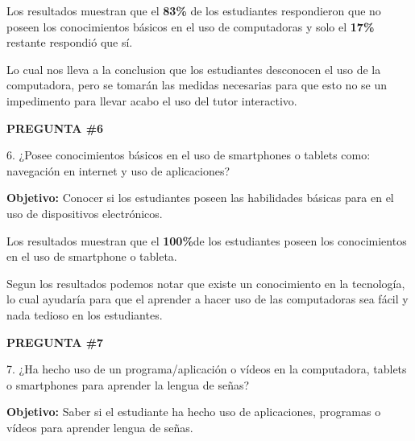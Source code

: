 \documentclass[12pt]{report}%
\begin{document}
\begin{center}
\end{center}


Los resultados muestran que el \textbf{83\%} de los estudiantes respondieron que no poseen los conocimientos básicos en el uso de computadoras y solo el \textbf{17\%} restante respondió que sí.

Lo cual nos lleva  a la conclusion que los estudiantes desconocen el uso de la computadora, pero se tomarán las medidas necesarias para que esto no se un impedimento para llevar acabo el uso del tutor interactivo.

\newpage
\textbf{PREGUNTA \#6}

6. ¿Posee conocimientos básicos en el uso de smartphones o tablets como: navegación en internet y uso de aplicaciones?

\textbf{Objetivo:} Conocer si los estudiantes poseen las habilidades básicas para en el uso de dispositivos electrónicos.

\begin{center}
\end{center}


Los resultados muestran que el \textbf{100\%}de los estudiantes poseen los conocimientos en el uso de smartphone o tableta.

Segun los resultados podemos notar que existe un conocimiento en la tecnología, lo cual ayudaría para que el aprender a hacer uso de las computadoras sea fácil y nada tedioso en los estudiantes. 

\newpage
\textbf{PREGUNTA \#7}

7. ¿Ha hecho uso de un programa/aplicación o vídeos en la computadora, tablets o smartphones para aprender la lengua de señas?

\textbf{Objetivo:} Saber si el estudiante ha hecho uso de aplicaciones, programas o vídeos para aprender lengua de señas.

\begin{center}
\end{center}
\end{document}
